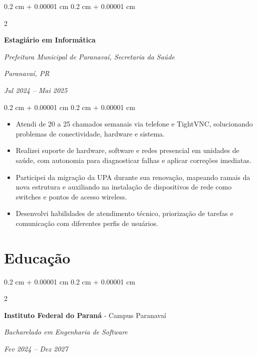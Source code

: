 \documentclass[10pt, letterpaper]{article}
\newenvironment{highlights}{
    \begin{itemize}[
        topsep=0.10 cm,
        parsep=0.10 cm,
        partopsep=0pt,
        itemsep=0pt,
        leftmargin=0.4 cm + 10pt
    ]
}{
    \end{itemize}
} %
\newenvironment{onecolentry}{
    \begin{adjustwidth}{
        0.2 cm + 0.00001 cm
    }{
        0.2 cm + 0.00001 cm
    }
}{
    \end{adjustwidth}
} %
\newenvironment{twocolentry}[2][]{
    \onecolentry
    \def\secondColumn{#2}
    \setcolumnwidth{\fill, 4.5 cm}
    \begin{paracol}{2}
}{
    \switchcolumn \raggedleft \secondColumn
    \end{paracol}
    \endonecolentry
} %
\begin{document}

        \begin{twocolentry}{
        \textit{Paranavaí, PR}    
            
        \textit{Jul 2024 – Mai 2025}}
            \textbf{Estagiário em Informática}
            
            \textit{Prefeitura Municipal de Paranavaí, Secretaria da Saúde}
        \end{twocolentry}

        \vspace{0.10 cm}
        
        \begin{onecolentry}
            \begin{highlights}
                \item Atendi de 20 a 25 chamados semanais via telefone e TightVNC, solucionando problemas de conectividade, hardware e sistema.
                \item Realizei suporte de hardware, software e redes presencial em unidades de saúde, com autonomia para diagnosticar falhas e aplicar correções imediatas.
                \item Participei da migração da UPA durante sua renovação, mapeando ramais da nova estrutura e auxiliando na instalação de dispositivos de rede como switches e pontos de acesso wireless.
                \item Desenvolvi habilidades de atendimento técnico, priorização de tarefas e comunicação com diferentes perfis de usuários.
            \end{highlights}
        \end{onecolentry}



    \section{Educação}

        \begin{twocolentry}{
                        
        \textit{Fev 2024 – Dez 2027}}
            \textbf{Instituto Federal do Paraná} - Campus Paranavaí

            \textit{Bacharelado em Engenharia de Software}
            
        \end{twocolentry}
    
\end{document}

